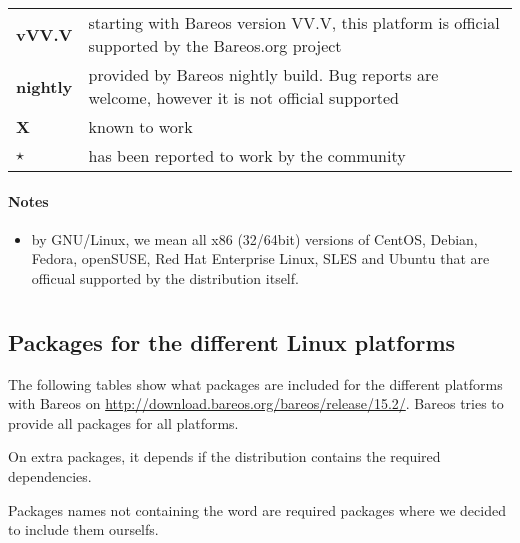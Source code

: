 \begin{tabular}[h]{l l}
\textbf{vVV.V}   & starting with Bareos version VV.V, this platform is official supported by the Bareos.org project \\
\textbf{nightly} & provided by Bareos nightly build. Bug reports are welcome, however it is not official supported \\
\textbf{X}       & known to work \\
\textbf{$\star$} & has been reported to work by the community\\
\end{tabular}

\paragraph{Notes}

\begin{itemize}
    \item by GNU/Linux, we mean all x86 (32/64bit) versions of CentOS, Debian, Fedora, openSUSE, Red Hat Enterprise Linux, SLES and Ubuntu that are officual supported  by the distribution itself.
\end{itemize}

\section{}

\subsection{Packages for the different Linux platforms}
\label{sec:packages}

The following tables show what packages are included for the different platforms with Bareos on \url{http://download.bareos.org/bareos/release/15.2/}.
Bareos tries to provide all packages for all platforms.

On extra packages, it depends if the distribution contains the required dependencies.

Packages names not containing the word  are required packages where we decided to include them ourselfs.

{
    \small
    
    
    
}







